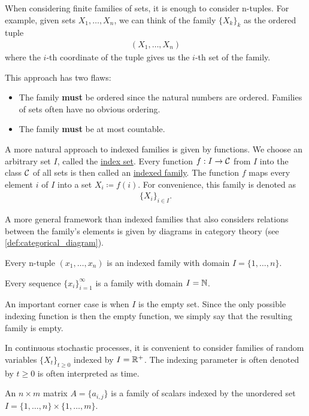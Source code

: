 \begin{definition}\label{def:indexed_family}
  When considering finite families of sets, it is enough to consider n-tuples. For example, given sets $X_1, \ldots, X_n$, we can think of the family $\{ X_k \}_k$ as the ordered tuple
  \begin{align*}
    (X_1, \ldots, X_n)
  \end{align*}
  where the $i$-th coordinate of the tuple gives us the $i$-th set of the family.

  This approach has two flaws:
  \begin{itemize}
    \item The family \textbf{must} be ordered since the natural numbers are ordered. Families of sets often have no obvious ordering.
    \item The family \textbf{must} be at most countable.
  \end{itemize}

  A more natural approach to indexed families is given by functions. We choose an arbitrary set $I$, called the \uline{index set}. Every function $f: I \to \mathcal C$ from $I$ into the class $\cal C$ of all sets is then called an \uline{indexed family}. The function $f$ maps every element $i$ of $I$ into a set $X_i \coloneqq f(i)$. For convenience, this family is denoted as
  \begin{align*}
    \{ X_i \}_{i \in I}.
  \end{align*}

  A more general framework than indexed families that also considers relations between the family's elements is given by diagrams in category theory (see \cref{def:categorical_diagram}).
\end{definition}

\begin{example}\label{def:indexed_families}
  \mbox{}
  \begin{defenum}
    \item Every n-tuple $(x_1, \ldots, x_n)$ is an indexed family with domain $I = \{ 1, \ldots, n \}$.

    \item Every sequence $\{ x_i \}_{i=1}^\infty$ is a family with domain $I = \mathbb N$.

    \item An important corner case is when $I$ is the empty set. Since the only possible indexing function is then the empty function, we simply say that the resulting family is empty.

    \item In continuous stochastic processes, it is convenient to consider families of random variables $\{ X_t \}_{t \geq 0}$ indexed by $I = \mathbb R^+$. The indexing parameter is often denoted by $t \geq 0$ is often interpreted as time.

    \item An $n \times m$ matrix $A = \{ a_{i,j} \}$ is a family of scalars indexed by the unordered set $I = \{ 1, \ldots, n \} \times \{ 1, \ldots, m \}$.
  \end{defenum}
\end{example}

